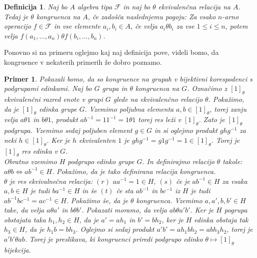 \documentclass[a4paper,11pt]{article}
\newtheorem{definicija}{Definicija}
\newtheorem{primer}{Primer}
\begin{document}
\begin{definicija}
    Naj bo $A$ algebra tipa $\mathcal{F}$ in naj bo $\theta$ ekvivalenčna relacija na $A$. Tedaj je $\theta$ 
    \emph{kongruenca} na $A$, če zadošča naslednjemu pogoju: Za vsako $n$-arno operacijo $f \in \mathcal{F}$ in 
    vse elemente $a_i, b_i \in A$, če velja $a_i \theta b_i$ za vse $1 \leq i \leq n$, potem velja $f \left(a_1, \dots, 
    a_n\right) \theta f\left(b_i, \dots, b_n\right)$.
\end{definicija}

Ponovno si na primeru oglejmo kaj naj definicija pove, videli bomo, da kongruence v nekaterih primerih že dobro poznamo.

\begin{primer}
 Pokazali bomo, da so kongruence na grupah v bijektivni korespodenci s podgrupami edinkami. 
 Naj bo $G$ grupa in $\theta$ kongruenca na $G$. Označimo z $\left[1\right]_{\theta}$ ekvivalenčni razred enote v grupi 
 $G$ glede na ekvivalenčno relacijo $\theta$. Pokažimo, da je $\left[1\right]_{\theta}$ edinka grupe $G$. Vzemimo 
 poljubna elementa $a, b \in \left[1\right]_{\theta}$, torej zanju velja $a \theta 1$ in $b \theta 1$, produkt 
 $a b^{-1} = 1 1^{-1} = 1 \theta 1$ torej res leži v $\left[1\right]_{\theta}$. Zato je $\left[1\right]_{\theta}$ 
 podgrupa. Vzemimo sedaj poljuben element $g \in G$ in si oglejmo produkt $g h g^{-1}$ za neki $h \in 
 \left[1\right]_{\theta}$. Ker je $h$ ekvivalenten $1$ je $g h g^{-1} = g 1 g^{-1} = 1 \in \left[1\right]_{\theta}$. 
 Torej je $\left[1\right]_{\theta}$ res edinka v $G$.\\
 Obratno vzemimo $H$ podgrupo edinko grupe $G$. In definirajmo relacijo $\theta$ takole: $a \theta b \Leftrightarrow 
 a b^{-1} \in H$. Pokažimo, da je tako definirana relacija kongruenca.\\ 
 $\theta$ je res ekvivalnečna relacija: $(r)$ $aa^{-1}=
 1 \in H$, $(s)$ če je $ab^{-1} \in H$ za vsaka $a, b \in H$ je tudi $ba^{-1} \in H$ in še $(t)$ če sta $ab^{-1}$ in
 $bc^{-1}$ iz $H$ je tudi $ab^{-1} b c^{-1}= a c^{-1} \in H$. Pokažimo še, da je $\theta$ kongruenca. Vzemimo $a, a', 
 b, b'\in H$ take, da velja $a \theta a'$ in $b \theta b'$. Pokazati moramo, da velja $ab \theta a'b'$. Ker je $H$ 
 pogrupa obstajata taka $h_1, h_2 \in H$, da je $a' = ah_1$ in $b' = b h_2$, ker je $H$ edinka obstaja tak $h_3 \in H$, 
 da je $h_1b = bh_3$. Oglejmo si sedaj produkt $a'b' = ah_1bh_2 = abh_3h_2$, torej je $a'b' \theta ab$. 
 Torej je preslikava, ki kongruenci priredi podgrupo edinko $\theta \mapsto \left[1\right]_{\theta}$ bijekcija.

\end{primer}
\end{document}
